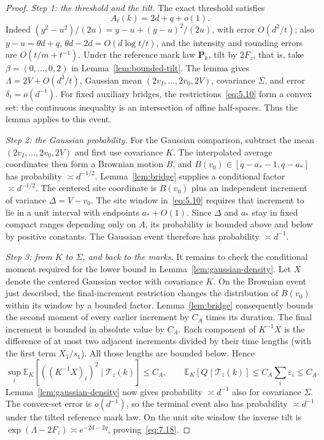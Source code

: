 \documentclass[11pt,letterpaper,reqno]{amsart}
\newif\ifrevmarks \revmarkstrue
\newif\ifshowdeleted \showdeletedfalse
\newcommand{\add}[1]{\ifrevmarks\textcolor{revorange}{#1}\else#1\fi}
\newcommand{\del}[1]{\ifrevmarks\ifshowdeleted{\color{revorange}\footnotesize[\textit{deleted:}~#1]}%
  \else\mbox{\textsuperscript{\textcolor{revorange}{\normalfont\bfseries[del]}}}\fi\fi}
\numberwithin{equation}{section}
\theoremstyle{remark}
\begin{document}
\begin{proof}
\add{\emph{Step 1: the threshold and the tilt.}} The exact threshold satisfies
\begin{equation}\label{eq:7.19}
A_t(k)=2d+q+o(1).
\end{equation}
Indeed $(y^2-u^2)/(2u)=y-u+(y-u)^2/(2u)$, with error $O(d^2/t)$; also
$y-u=\theta d+q$, $\theta d-2d=O(d\log t/t)$, and the intensity and rounding errors are $O(t/m+t^{-1})$.
Under the reference mark law $\mathbf P_k$, tilt by $2F_z$\add{, that is, take $\beta=(0,\ldots,0,2)$ in Lemma~\ref{lem:bounded-tilt}}. \del{Lemma~\ref{lem:bounded-tilt}}\add{The lemma} gives
$\Lambda=2V+O(d^3/t)$, Gaussian mean
$(2v_I,\ldots,2v_0,2V)$, covariance $\Sigma$, and error $\delta_t=o(d^{-1})$.
For fixed auxiliary bridges, the restrictions~\eqref{eq:5.10} form a convex set: the continuous inequality is an intersection of affine half-spaces. Thus the lemma applies to this event.

\add{\emph{Step 2: the Gaussian probability.}} For the Gaussian comparison, subtract the mean $(2v_I,\ldots,2v_0,2V)$ and first use covariance $K$. The interpolated average coordinates then form a Brownian motion $B$, and
$B(v_0)\in[q-a_*-1,q-a_*]$ has probability $\asymp d^{-1/2}$.
Lemma~\ref{lem:bridge} supplies a conditional factor $\asymp d^{-1/2}$.
The centered site coordinate is $B(v_0)$ plus an independent increment of variance
$\Delta=V-v_0$. The site window in~\eqref{eq:5.10} requires that increment to lie in a unit interval with endpoints $a_*+O(1)$. Since $\Delta$ and $a_*$ stay in fixed compact ranges depending only on $A$, its probability is bounded above and below by positive constants. The Gaussian event therefore has probability $\asymp d^{-1}$.

\add{\emph{Step 3: from $K$ to $\Sigma$, and back to the marks.}} It remains to check the conditional moment required for the lower bound in Lemma~\ref{lem:gaussian-density}. Let $X$ denote the centered Gaussian vector with covariance $K$. On the Brownian event just described, the final-increment restriction changes the distribution of $B(v_0)$ within its window by a bounded factor. Lemma~\ref{lem:bridge} consequently bounds the second moment of every earlier increment by $C_A$ times its duration. The final increment is bounded in absolute value by $C_A$.
Each component of $K^{-1}X$ is the difference of at most two adjacent increments divided by their time lengths (with the first term $X_1/s_1$). All those lengths are bounded below. Hence
\[
\sup_i\mathbb E_K[((K^{-1}X)_i)^2\mid\mathcal T_z(k)]\le C_A,
\qquad \mathbb E_K[Q\mid\mathcal T_z(k)]\le C_A\sum_i\varepsilon_i\le C_A.
\]
Lemma~\ref{lem:gaussian-density} now gives probability $\asymp d^{-1}$ also for covariance $\Sigma$.
The convex-set error is $o(d^{-1})$, so the terminal event also has probability $\asymp d^{-1}$ under the tilted reference mark law. On the unit site window the inverse tilt is
$\exp(\Lambda-2F_z)\asymp e^{-2d-2q}$, proving~\eqref{eq:7.18}.
\end{proof}
\end{document}
